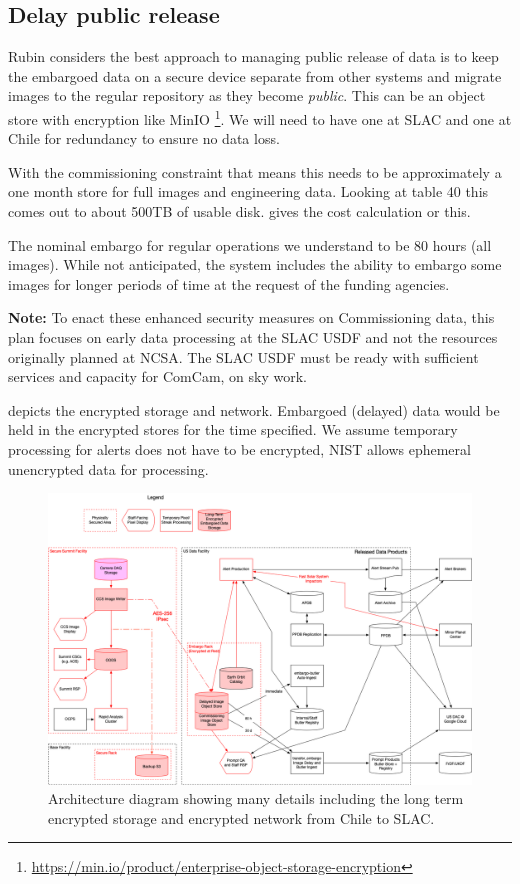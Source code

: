 
\subsection{Delay public release} \label{sec:3delay}

Rubin considers the best approach to managing public release of data is to keep the embargoed data on a secure device separate from other systems and migrate images to the regular repository as they become \emph{public}.
This can be an object store with encryption like MinIO \footnote{\url{ https://min.io/product/enterprise-object-storage-encryption}}.
We will need to have one at \gls{SLAC} and one at Chile for redundancy to ensure no data loss.

With the commissioning constraint that means this needs to be approximately a one month store  for full images and engineering data.
Looking at 
table 40 this comes out to about 500TB of usable disk.
 gives the cost calculation or this.

The nominal embargo for regular operations we understand to be 80 hours (all images).
While not anticipated, the system includes the ability to embargo some images for longer periods of  time at the request of the funding agencies.



{\bf Note:} To enact these enhanced security measures on \gls{Commissioning} data, this plan focuses on early data processing at the SLAC USDF and not the resources originally planned at NCSA. The SLAC USDF must be ready with sufficient services and capacity for \gls{ComCam}, on sky work.

 depicts the encrypted storage and network. Embargoed (delayed) data would be held in the encrypted stores for the time specified.
We assume temporary processing for alerts does not have to be encrypted, \gls{NIST} allows ephemeral unencrypted data for processing.

\begin{figure}
\begin{centering}
\includegraphics[width=\textwidth]{Embargo_arch}
	\caption{ Architecture diagram showing many details including the long term encrypted storage and encrypted network from Chile to SLAC. \label{fig:arch}}
\end{centering}
\end{figure}
